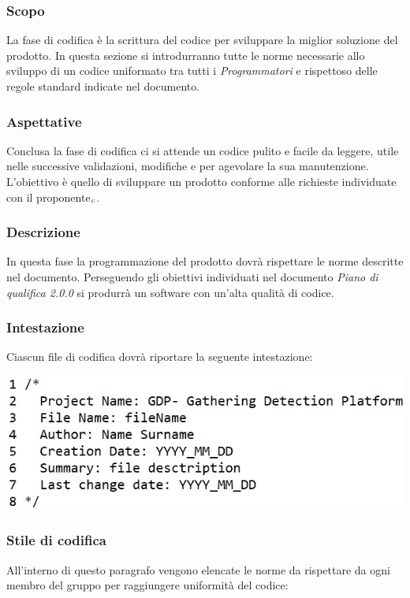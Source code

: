 \subsubsection{Scopo}\label{ProcessiPrimariCodificaScopo}
La fase di codifica è la scrittura del codice per sviluppare la miglior soluzione del prodotto. In questa sezione si introdurranno tutte le norme necessarie allo sviluppo di un codice uniformato tra tutti i \textit{Programmatori} e rispettoso delle regole standard indicate nel documento.
\subsubsection{Aspettative}\label{ProcessiPrimariCodificaAspettative}
Conclusa la fase di codifica ci si attende un codice pulito e facile da leggere, utile nelle successive validazioni, modifiche e per agevolare la sua manutenzione. L'obiettivo è quello di sviluppare un prodotto conforme alle richieste individuate con il proponente$_{\scaleto{G}{3pt}}$.

\subsubsection{Descrizione}\label{ProcessiPrimariCodificaDescrizione}
In questa fase la programmazione del prodotto dovrà rispettare le norme descritte nel documento. Perseguendo gli obiettivi individuati nel documento \textit{Piano di qualifica 2.0.0} si produrrà un software con un'alta qualità di codice.

\subsubsection{Intestazione} \label{ProcessiPrimariCodificaIntestazione}
Ciascun file di codifica dovrà riportare la seguente intestazione:
\begin{center}
	\includegraphics[width=0.5\linewidth]{../immagini/IntestazioneNorme.png}
\end{center}

\subsubsection{Stile di codifica}\label{ProcessiPrimariCodificaStileDiCodifica}
All'interno di questo paragrafo vengono elencate le norme da rispettare da ogni membro del gruppo per raggiungere uniformità del codice:

